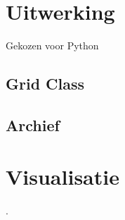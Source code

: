 \documentclass[a4paper]{article}
\begin{document}
\section{Uitwerking}
Gekozen voor Python

\subsection{Grid Class}


\subsection{Archief}


\section{Visualisatie}


 \cite{greenwade93}. 



\end{document}
